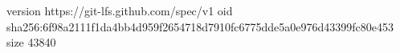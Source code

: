 version https://git-lfs.github.com/spec/v1
oid sha256:6f98a2111f1da4bb4d959f2654718d7910fc6775dde5a0e976d43399fc80e453
size 43840
